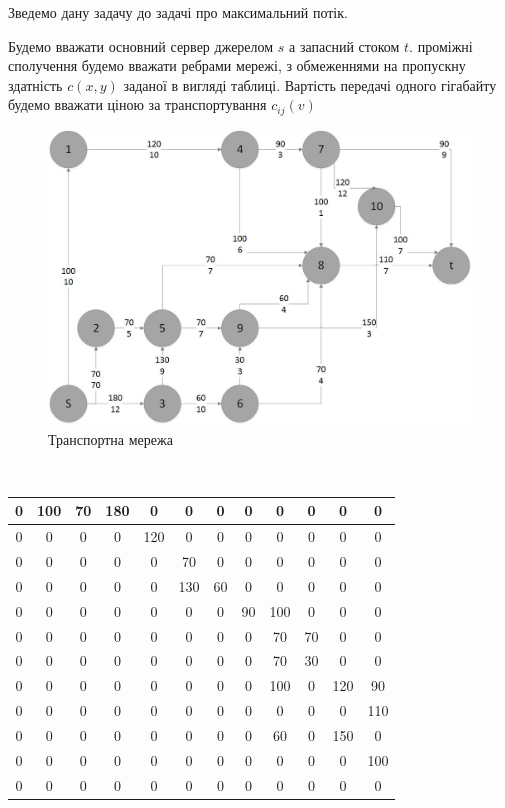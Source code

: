 \documentclass[a4paper,14pt,russian,ukrainian,oneside,final]{extreport}
\begin{document}
\indent
Зведемо дану задачу до задачі про максимальний потік.
\par Будемо вважати основний сервер джерелом $s$ а запасний стоком $t$. проміжні сполучення будемо вважати ребрами мережі, з обмеженнями на пропускну здатність $c(x,y)$ заданої в вигляді таблиці.
 Вартість передачі одного гігабайту будемо вважати ціною за транспортування $c_{ij}(v)$
\begin{figure}[h]
\begin{center}
\includegraphics[scale=0.60]{G2.jpg}
\caption{Транспортна мережа}
\end{center}
\end{figure}
\\
\begin{center}
\begin{tabular}{|c|c|c|c|c|c|c|c|c|c|c|c|}
\hline
0&100&70&180&0&0&0&0&0&0&0&0 \\ \hline
0&0&0&0&120&0&0&0&0&0&0&0 \\ \hline
0&0&0&0&0&70&0&0&0&0&0&0 \\ \hline
0&0&0&0&0&130&60&0&0&0&0&0 \\ \hline
0&0&0&0&0&0&0&90&100&0&0&0 \\ \hline
0&0&0&0&0&0&0&0&70&70&0&0 \\ \hline
0&0&0&0&0&0&0&0&70&30&0&0 \\ \hline
0&0&0&0&0&0&0&0&100&0&120&90 \\ \hline
0&0&0&0&0&0&0&0&0&0&0&110 \\ \hline
0&0&0&0&0&0&0&0&60&0&150&0 \\ \hline
0&0&0&0&0&0&0&0&0&0&0&100 \\ \hline
0&0&0&0&0&0&0&0&0&0&0&0 \\ \hline
\end{tabular}
\end{center}
\end{document}

